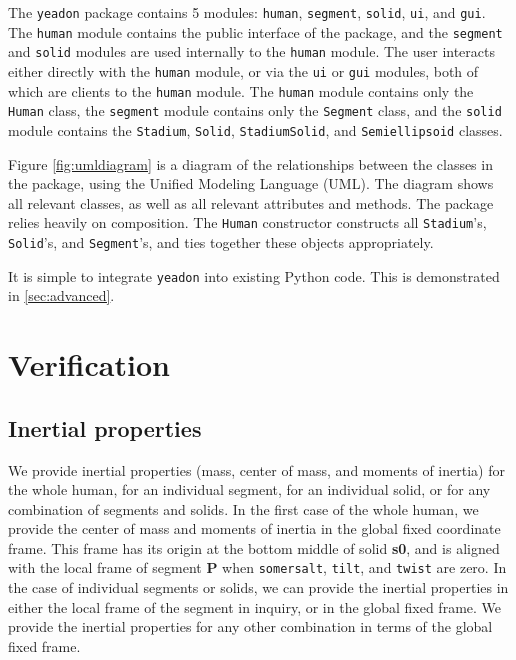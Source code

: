 \documentclass[10pt]{article}
\begin{document}


The \verb+yeadon+ package contains 5 modules: \verb+human+, \verb+segment+,
\verb+solid+, \verb+ui+, and \verb+gui+. The \verb+human+ module contains the
public interface of the package, and the \verb+segment+ and \verb+solid+
modules are used internally to the \verb+human+ module. The user interacts
either directly with the \verb+human+ module, or via the \verb+ui+ or
\verb+gui+ modules, both of which are clients to the \verb+human+ module. The
\verb+human+ module contains only the \verb+Human+ class, the \verb+segment+
module contains only the \verb+Segment+ class, and the \verb+solid+ module
contains the \verb+Stadium+, \verb+Solid+, \verb+StadiumSolid+, and
\verb+Semiellipsoid+ classes. 

Figure \ref{fig:umldiagram} is a diagram of the
relationships between the classes in the package, using the Unified Modeling
Language (UML). The diagram shows all relevant classes, as well as all relevant
attributes and methods. The package relies heavily on composition. The
\verb+Human+ constructor constructs all \verb+Stadium+'s, \verb+Solid+'s, and
\verb+Segment+'s, and ties together these objects appropriately.


It is simple to integrate \verb+yeadon+ into existing Python code. This is
demonstrated in \ref{sec:advanced}.


\section*{Verification}

\subsection*{Inertial properties}

We provide inertial properties (mass, center of mass, and moments of inertia)
for the whole human, for an individual segment, for an individual solid, or for
any combination of segments and solids. In the first case of the whole human,
 we provide the center of mass and moments of inertia in the global fixed coordinate frame. This frame has its
 origin at the bottom middle of solid \textbf{s0}, and is aligned with the
local frame of segment \textbf{P} when \verb+somersalt+, \verb+tilt+, and
\verb+twist+ are zero.
In the case of individual segments or solids, we can provide the inertial
properties in either the local frame of the segment in inquiry, or in the
global fixed frame. We provide the inertial properties for any other
combination in terms of the global fixed frame.
\end{document}
